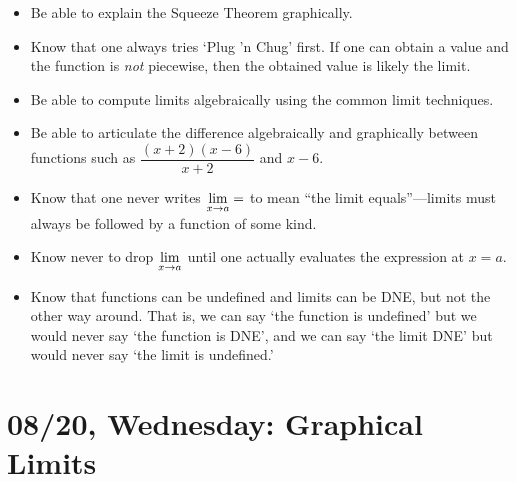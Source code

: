 \documentclass[11pt,letterpaper]{article}
\begin{document}
\begin{itemize}
\item Be able to explain the Squeeze Theorem graphically. 

\item Know that one always tries `Plug 'n Chug' first. If one can obtain a value and the function is \textit{not} piecewise, then the obtained value is likely the limit. 

\item Be able to compute limits algebraically using the common limit techniques.

\item Be able to articulate the difference algebraically and graphically between functions such as $\dfrac{(x + 2)(x - 6)}{x + 2}$ and $x - 6$. 

\item Know that one never writes $\displaystyle\lim_{x \to a} = $ to mean ``the limit equals''---limits must always be followed by a function of some kind.

\item Know never to drop $\displaystyle\lim_{x \to a}$ until one actually evaluates the expression at $x= a$. 

\item Know that functions can be undefined and limits can be DNE, but not the other way around. That is, we can say `the function is undefined' but we would never say `the function is DNE', and we can say `the limit DNE' but would never say `the limit is undefined.' 
\end{itemize}

\newpage
\section*{08/20, Wednesday: Graphical Limits\label{08-20}}
\end{document}
